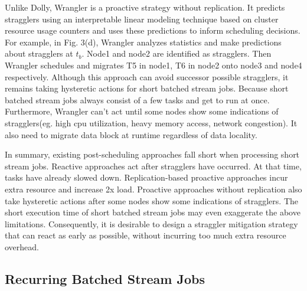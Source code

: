 \documentclass[10pt,conference,compsocconf,letterpaper]{IEEEtran}
\begin{document}
  Unlike Dolly, Wrangler \cite{Yadwadkar2014} is a proactive strategy without replication. It predicts stragglers using an interpretable linear modeling technique based on cluster resource usage counters and uses these predictions to inform scheduling decisions. For example, in Fig. 3(d), Wrangler analyzes statistics and make predictions about stragglers at $t_b$. Node1 and node2 are identified as stragglers. Then Wrangler schedules and migrates T5 in node1, T6 in node2 onto node3 and node4 respectively. Although this approach can avoid successor possible stragglers, it remains taking hysteretic actions for short batched stream jobs. Because short batched stream jobs always consist of a few tasks and get to run at once. Furthermore, Wrangler can't act until some nodes show some indications of stragglers(eg. high cpu utilization, heavy memory access, network congestion). It also need to migrate data block at runtime regardless of data locality.

  In summary, existing post-scheduling approaches fall short when processing short stream jobs. Reactive approaches act after stragglers have occurred. At that time, tasks have already slowed down. Replication-based proactive approaches incur extra resource and increase 2x load. Proactive approaches without replication also take hysteretic actions after some nodes show some indications of stragglers. The short execution time of short batched stream jobs may even exaggerate the above limitations. Consequently, it is desirable to design a straggler mitigation strategy that can react as early as possible, without incurring too much extra resource overhead.

\subsection{Recurring Batched Stream Jobs}
\end{document}
